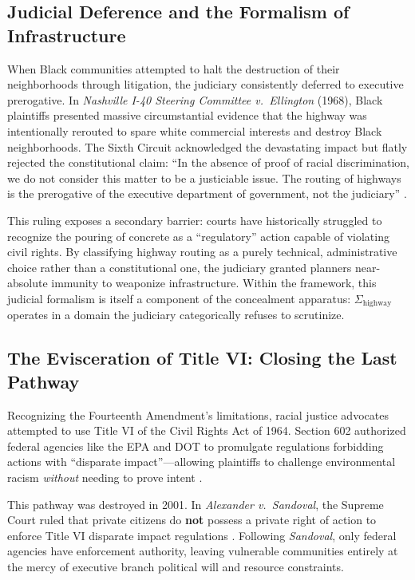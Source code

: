 \documentclass[12pt,openany]{book}
\begin{document}
\subsection{Judicial Deference and the Formalism of Infrastructure}

When Black communities attempted to halt the destruction of their neighborhoods through litigation, the judiciary consistently deferred to executive prerogative. In \textit{Nashville I-40 Steering Committee v.\ Ellington} (1968), Black plaintiffs presented massive circumstantial evidence that the highway was intentionally rerouted to spare white commercial interests and destroy Black neighborhoods. The Sixth Circuit acknowledged the devastating impact but flatly rejected the constitutional claim: ``In the absence of proof of racial discrimination, we do not consider this matter to be a justiciable issue. The routing of highways is the prerogative of the executive department of government, not the judiciary'' \cite{tel_nashville_case}.

This ruling exposes a secondary barrier: courts have historically struggled to recognize the pouring of concrete as a ``regulatory'' action capable of violating civil rights. By classifying highway routing as a purely technical, administrative choice rather than a constitutional one, the judiciary granted planners near-absolute immunity to weaponize infrastructure. Within the framework, this judicial formalism is itself a component of the concealment apparatus: $\Sigma_{\text{highway}}$ operates in a domain the judiciary categorically refuses to scrutinize.

\subsection{The Evisceration of Title VI: Closing the Last Pathway}

Recognizing the Fourteenth Amendment's limitations, racial justice advocates attempted to use Title VI of the Civil Rights Act of 1964. Section 602 authorized federal agencies like the EPA and DOT to promulgate regulations forbidding actions with ``disparate impact''---allowing plaintiffs to challenge environmental racism \textit{without} needing to prove intent \cite{tel_title_vi}.

This pathway was destroyed in 2001. In \textit{Alexander v.\ Sandoval}, the Supreme Court ruled that private citizens do \textbf{not} possess a private right of action to enforce Title VI disparate impact regulations \cite{tel_sandoval}. Following \textit{Sandoval}, only federal agencies have enforcement authority, leaving vulnerable communities entirely at the mercy of executive branch political will and resource constraints.
\end{document}
